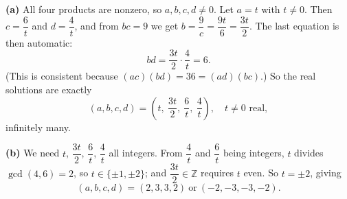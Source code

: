 \textbf{(a)} All four products are nonzero, so $a,b,c,d\ne0$. Let $a=t$ with $t\ne0$. Then $c=\dfrac{6}{t}$ and $d=\dfrac{4}{t}$, and from $bc=9$ we get $b=\dfrac{9}{c}=\dfrac{9t}{6}=\dfrac{3t}{2}$. The last equation is then automatic:
\[bd=\dfrac{3t}{2}\cdot\dfrac{4}{t}=6.\]
(This is consistent because $(ac)(bd)=36=(ad)(bc)$.) So the real solutions are exactly
\[\boxed{(a,b,c,d)=\left(t,\ \dfrac{3t}{2},\ \dfrac{6}{t},\ \dfrac{4}{t}\right),\quad t\ne0\text{ real}},\]
infinitely many.

\textbf{(b)} We need $t$, $\dfrac{3t}{2}$, $\dfrac{6}{t}$, $\dfrac{4}{t}$ all integers. From $\dfrac{4}{t}$ and $\dfrac{6}{t}$ being integers, $t$ divides $\gcd(4,6)=2$, so $t\in\{\pm1,\pm2\}$; and $\dfrac{3t}{2}\in\mathbb Z$ requires $t$ even. So $t=\pm2$, giving
\[\boxed{(a,b,c,d)=(2,3,3,2)\ \text{or}\ (-2,-3,-3,-2)}.\]
